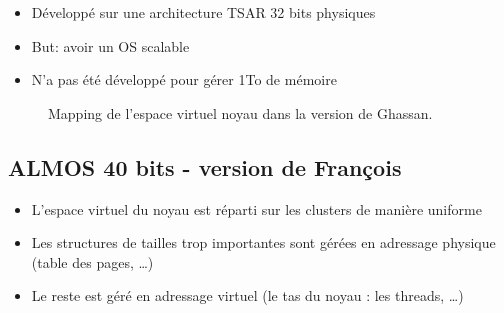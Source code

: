 \documentclass[t]{beamer}
\begin{document}
      \begin{frame}{\subsecname}
            \begin{itemize}
              \item Développé sur une architecture TSAR 32 bits physiques
              \item But: avoir un OS scalable
              \item N'a pas été développé pour gérer 1To de mémoire 
            \end{itemize}
            \begin{figure}
              \centering
              \def\svgwidth{160pt}
              
              \caption{Mapping de l'espace virtuel noyau dans la version de
              Ghassan.}
            \end{figure}
      \end{frame}

    \subsection{ALMOS 40 bits - version de François}

      \begin{frame}{\subsecname}
        \vspace{2cm}
        \begin{itemize}
          \item L'espace virtuel du noyau est réparti sur les clusters de
            manière uniforme
          \item Les structures de tailles trop importantes sont gérées en
            adressage physique (table des pages, \ldots)
          \item Le reste est géré en adressage virtuel (le tas du
            noyau : les threads, \ldots)
        \end{itemize}
      \end{frame}
\end{document}
